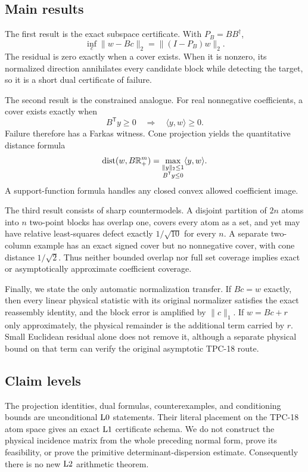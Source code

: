 \subsection{Main results}

The first result is the exact subspace certificate.  With
\(P_B=BB^\dagger\),
\[
 \inf_c\|w-Bc\|_2=\|(I-P_B)w\|_2.
\]
The residual is zero exactly when a cover exists.  When it is nonzero,
its normalized direction annihilates every candidate block while
detecting the target, so it is a short dual certificate of failure.

The second result is the constrained analogue.  For real
nonnegative coefficients, a cover exists exactly when
\[
 B^{\mathsf T}y\ge0\quad\Longrightarrow\quad
 \langle y,w\rangle\ge0.
\]
Failure therefore has a Farkas witness.  Cone projection yields the
quantitative distance formula
\[
 \operatorname{dist}(w,B\mathbb R_+^m)
 =
 \max_{\substack{\|y\|_2\le1\\B^{\mathsf T}y\le0}}
 \langle y,w\rangle.
\]
A support-function formula handles any closed convex allowed
coefficient image.

The third result consists of sharp countermodels.  A disjoint
partition of \(2n\) atoms into \(n\) two-point blocks has overlap one,
covers every atom as a set, and yet may have relative least-squares
defect exactly \(1/\sqrt{10}\) for every \(n\).  A separate two-column
example has an exact signed cover but no nonnegative cover, with cone
distance \(1/\sqrt2\).  Thus neither bounded overlap nor full set
coverage implies exact or asymptotically approximate coefficient
coverage.

Finally, we state the only automatic normalization transfer.  If
\(Bc=w\) exactly, then every linear physical statistic with its
original normalizer satisfies the exact reassembly identity, and the
block error is amplified by \(\|c\|_1\).  If
\(w=Bc+r\) only approximately, the physical remainder is the
additional term carried by \(r\).  Small Euclidean residual alone
does not remove it, although a separate physical bound on that term
can verify the original asymptotic TPC-18 route.

\subsection{Claim levels}

The projection identities, dual formulas, counterexamples, and
conditioning bounds are unconditional \(\mathrm{L0}\) statements.  Their
literal placement on the TPC-18 atom space gives an exact \(\mathrm{L1}\)
certificate schema.  We do not construct the physical incidence
matrix from the whole preceding normal form, prove its feasibility,
or prove the primitive determinant-dispersion estimate.  Consequently
there is no new \(\mathrm{L2}\) arithmetic theorem.

